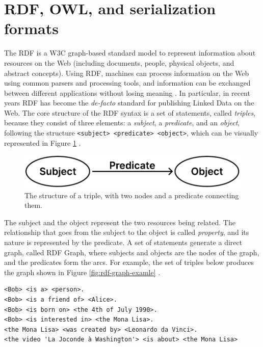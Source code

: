 \section{RDF, OWL, and serialization formats}
\label{sec:rdf-owl-formats}

The \acf{RDF} is a \ac{W3C} graph-based standard model to represent information about resources on the Web (including documents, people, physical objects, and abstract concepts). Using \ac{RDF}, machines can process information on the Web using common parsers and processing tools, and information can be exchanged between different applications without losing meaning \cite{world2014rdfprimer}. In particular, in recent years \ac{RDF} has become the \textit{de-facto} standard for publishing Linked Data on the Web. The core structure of the \ac{RDF} syntax is a set of statements, called \textit{triples}, because they consist of three elements: a \textit{subject}, a \textit{predicate}, and an \textit{object}, following the structure \verb#<subject> <predicate> <object>#, which can be visually represented in Figure \ref{fig:rdf-graph-structure} \cite{world2014rdfconcepts}.

\begin{figure}[!ht]
    \centering
    \includegraphics[width=0.55\columnwidth]{images/rdf/rdf-graph-structure.pdf}
    \caption{The structure of a triple, with two nodes and a predicate connecting them.}
    \label{fig:rdf-graph-structure}
\end{figure}

The subject and the object represent the two resources being related. The relationship that goes from the subject to the object is called \textit{property}, and its nature is represented by the predicate. A set of statements generate a direct graph, called RDF Graph, where subjects and objects are the nodes of the graph, and the predicates form the arcs. For example, the set of triples below produces the graph shown in Figure \ref{fig:rdf-graph-examle} \cite{world2014rdfprimer}.

\begin{verbatim}
<Bob> <is a> <person>.
<Bob> <is a friend of> <Alice>.
<Bob> <is born on> <the 4th of July 1990>.
<Bob> <is interested in> <the Mona Lisa>.
<the Mona Lisa> <was created by> <Leonardo da Vinci>.
<the video 'La Joconde à Washington'> <is about> <the Mona Lisa>
\end{verbatim}

